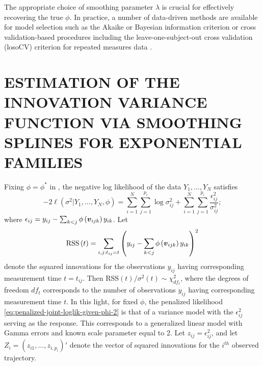 \documentclass[12pt]{article}
\newcommand{\bfv}{\mbox{\boldmath $v$}}
\begin{document}
The appropriate choice of smoothing parameter $\lambda$ is crucial for effectively recovering the true $\phi$. In practice, a number of data-driven methods are available for model selection such as the Akaike or Bayesian information criterion \cite{eilers1996flexible} or cross validation-based procedures \cite{wahba1990spline, gu1991minimizing} including the leave-one-subject-out cross validation (losoCV) criterion for repeated measures data \cite{xu2012asymptotic}.

\section*{\sffamily \large ESTIMATION OF THE INNOVATION VARIANCE FUNCTION VIA SMOOTHING SPLINES FOR EXPONENTIAL FAMILIES}

Fixing $\phi = \phi^*$ in , the negative log likelihood of the data $Y_1,\dots, Y_N$ satisfies
\begin{equation} \label{eq:penalized-joint-loglik-given-phi-2}
-2\ell\left(\sigma^2 \vert Y_1,\dots, Y_N ,\phi \right) =  \sum_{i = 1}^N \sum_{j = 1}^{p_i} \log \sigma^2_{ij}  + \sum_{i = 1}^N \sum_{j = 1}^{p_i} \frac {\epsilon_{ij}^2}{\sigma^2_{ij}};
\end{equation}
\noindent
where $\epsilon_{ij} =  y_{ij} - \sum_{k<j} \phi\left(\bfv_{ijk}\right) y_{ik}$. Let 
\begin{equation}
\mbox{RSS}\left( t \right) = \sum_{i,j:t_{ij}= t} \left( y_{ij} - \sum_{k<j} \phi\left(\bfv_{ijk}\right)  y_{ik}\right)^2
\end{equation}
\noindent
denote the squared innovations for the observations $y_{ij}$ having corresponding measurement time $t = t_{ij}$. Then $\mbox{RSS}\left( t \right)/\sigma^2\left(t\right) \sim \chi^2_{df_t}$, where the degrees of freedom $df_{t}$ corresponds to the number of observations $y_{ij}$ having corresponding measurement time $t$. In this light, for fixed $\phi$, the penalized likelihood \eqref{eq:penalized-joint-loglik-given-phi-2} is that of a variance model with the $\epsilon_{ij}^2$ serving as the response.  This corresponds to a generalized linear model with Gamma errors and known scale parameter equal to 2. Let $z_{ij} = \epsilon_{ij}^2$, and let $Z_{i} = \left(z_{i1},\dots, z_{i,p_i} \right)'$ denote the vector of squared innovations for the $i^{th}$ observed trajectory. 
\end{document}
